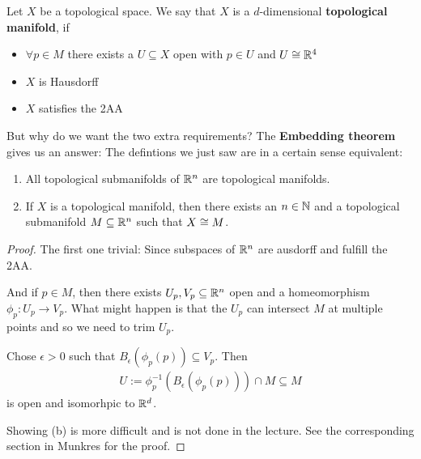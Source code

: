 \begin{dfn}[]
Let $X$ be a topological space.
We say that $X$ is a $d$-dimensional \textbf{topological manifold}, if 
\begin{itemize}
  \item $\forall  p \in M$ there exists a $U \subseteq X$ open with $p \in U$ and $U \cong \mathbb{R}^{4}$
  \item $X$ is Hausdorff
  \item $X$ satisfies the 2AA
\end{itemize}
\end{dfn}
But why do we want the two extra requirements? 
The \textbf{Embedding theorem} gives us an answer:
The defintions we just saw are in a certain sense equivalent:
\begin{thm}
  \phantom{a}
  \begin{enumerate}
    \item All topological submanifolds of $\mathbb{R}^{n}$ are topological manifolds.
    \item If $X$ is a topological manifold, then there exists an $n \in \mathbb{N}$ and a topological submanifold $M \subseteq \mathbb{R}^{n}$ such that $X \cong M$.
  \end{enumerate}
\end{thm}
\begin{proof}
  The first one trivial: Since subspaces of $\mathbb{R}^{n}$ are ausdorff and fulfill the 2AA.

  And if $p \in M$, then there exists $U_p,V_p \subseteq \mathbb{R}^{n}$ open and a homeomorphism $\phi_p:U_p \to V_p$.
  What might happen is that the $U_p$ can intersect $M$ at multiple points and so we need to trim $U_p$.

  Chose $\epsilon > 0$ such that $B_{\epsilon}(\phi_p(p)) \subseteq V_p$. Then
  \begin{align*}
    U := \phi_p^{-1}(B_{\epsilon}(\phi_p(p))) \cap M \subseteq M
  \end{align*}
  is open and isomorhpic to $\mathbb{R}^{d}$.

  
  Showing (b) is more difficult and is not done in the lecture. See the corresponding section in Munkres for the proof.
\end{proof}


